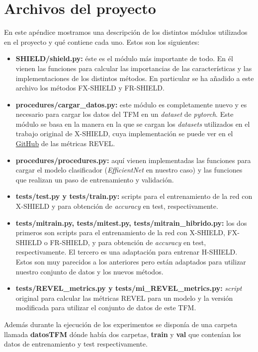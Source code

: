 
\chapter{Archivos del proyecto}\label{ap:apendice1}

En este apéndice mostramos una descripción de los distintos módulos utilizados en el proyecto y qué contiene cada uno. Estos son los siguientes:

\begin{itemize}
\item \textbf{SHIELD/shield.py:} éste es el módulo más importante de todo. En él vienen las funciones para calcular las importancias de las características y las implementaciones de los distintos métodos. En particular se ha añadido a este archivo los métodos FX-SHIELD y FR-SHIELD.

\item \textbf{procedures/cargar\_datos.py:} este módulo es completamente nuevo y es necesario para cargar los datos del TFM en un \textit{dataset} de \textit{pytorch}. Este módulo se basa en la manera en la que se cargan los \textit{datasets} utilizados en el trabajo original de X-SHIELD, cuya implementación se puede ver en el \href{https://github.com/ari-dasci/S-ReVel}{GitHub} de las métricas REVEL.

\item \textbf{procedures/procedures.py:} aquí vienen implementadas las funciones para cargar el modelo clasificador (\textit{EfficientNet} en nuestro caso) y las funciones que realizan un paso de entrenamiento y validación.

\item \textbf{tests/test.py y tests/train.py:} scripts para el entrenamiento de la red con X-SHIELD y para obtención de \textit{accuracy} en test, respectivamente.

\item \textbf{tests/mitrain.py, tests/mitest.py, tests/mitrain\_hibrido.py:} los dos primeros son scripts para el entrenamiento de la red con X-SHIELD, FX-SHIELD o FR-SHIELD, y para obtención de \textit{accuracy} en test, respectivamente. El tercero es una adaptación para entrenar H-SHIELD. Estos son muy parecidos a los anteriores pero están adaptados para utilizar nuestro conjunto de datos y los nuevos métodos.

\item \textbf{tests/REVEL\_metrics.py y tests/mi\_REVEL\_metrics.py:} \textit{script} original para calcular las métricas REVEL para un modelo y la versión modificada para utilizar el conjunto de datos de este TFM.
\end{itemize}

Además durante la ejecución de los experimentos se disponía de una carpeta llamada \textbf{datosTFM} dónde había dos carpetas, \textbf{train} y \textbf{val} que contenían los datos de entrenamiento y test respectivamente.

\endinput
